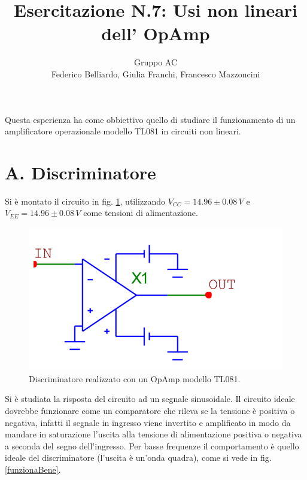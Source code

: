 \documentclass[10pt,a4paper]{article}
\author{Gruppo AC \\ Federico Belliardo, Giulia Franchi, Francesco Mazzoncini}
\title{Esercitazione N.7: Usi non lineari dell’ OpAmp}
\begin{document}
\maketitle
Questa esperienza ha come obbiettivo quello di studiare il funzionamento di un amplificatore operazionale modello TL081 in circuiti non lineari.

\section*{A. Discriminatore}

Si è montato il circuito in fig. \ref{circuito1}, utilizzando $V_{CC} = 14.96\pm0.08 \, V$ e $V_{EE} = 14.96 \pm 0.08 \, V$ come tensioni di alimentazione.

\begin{figure}[htb!]
\centering
\includegraphics[scale=0.5]{Discriminatore.png}
\caption{Discriminatore realizzato con un OpAmp modello TL081.}
\label{circuito1}
\end{figure}

Si è studiata la risposta del circuito ad un segnale sinusoidale. Il circuito ideale dovrebbe funzionare come un comparatore che rileva se la tensione è positiva o negativa, infatti il segnale in ingresso viene invertito e amplificato in modo da mandare in saturazione l'uscita alla tensione di alimentazione  positiva o negativa a seconda del segno dell'ingresso. Per basse frequenze il comportamento è quello ideale del discriminatore (l'uscita è un'onda quadra), come si vede in fig.\ref{funzionaBene}.
\end{document}

